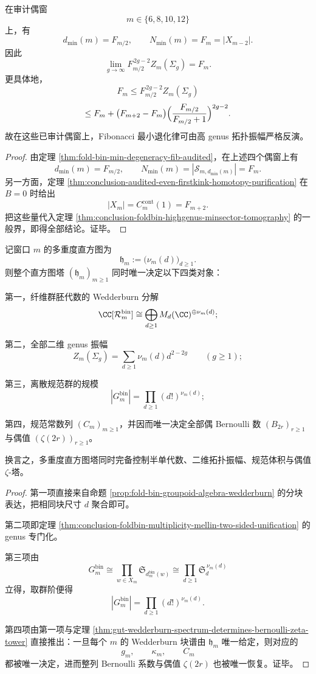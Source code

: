 \begin{corollary}\label{cor:conclusion-foldbin-audited-even-fibonacci-minsector-genus-recovery}
在审计偶窗
\[
m\in\{6,8,10,12\}
\]
上，有
\[
d_{\min}(m)=F_{m/2},
\qquad
N_{\min}(m)=F_m=|X_{m-2}|.
\]
因此
\[
\lim_{g\to\infty}F_{m/2}^{\,2g-2}Z_m(\Sigma_g)=F_m.
\]
更具体地，
\[
F_m
\le
F_{m/2}^{\,2g-2}Z_m(\Sigma_g)
\]
\[
\le
F_m+\bigl(F_{m+2}-F_m\bigr)
\Bigl(\frac{F_{m/2}}{F_{m/2}+1}\Bigr)^{2g-2}.
\]
故在这些已审计偶窗上，Fibonacci 最小退化律可由高 genus 拓扑振幅严格反演。
\end{corollary}
\begin{proof}
由定理 \ref{thm:fold-bin-min-degeneracy-fib-audited}，在上述四个偶窗上有
\[
d_{\min}(m)=F_{m/2},
\qquad
N_{\min}(m)=|\mathcal S_{m,d_{\min}(m)}|=F_m.
\]
另一方面，定理 \ref{thm:conclusion-audited-even-firstkink-homotopy-purification} 在 \(B=0\) 时给出
\[
|X_m|=C_m^{\mathrm{cont}}(1)=F_{m+2}.
\]
把这些量代入定理 \ref{thm:conclusion-foldbin-highgenus-minsector-tomography} 的一般界，即得全部结论。证毕。
\end{proof}

\begin{theorem}\label{thm:conclusion-foldbin-histogram-tower-arithmetic-topological-completeness}
记窗口 \(m\) 的多重度直方图为
\[
\mathfrak h_m:=\bigl(\nu_m(d)\bigr)_{d\ge 1}.
\]
则整个直方图塔 \((\mathfrak h_m)_{m\ge 1}\) 同时唯一决定以下四类对象：

第一，纤维群胚代数的 Wedderburn 分解
\[
\CC[\mathcal R_m^{\mathrm{bin}}]
\cong
\bigoplus_{d\ge 1}M_d(\CC)^{\oplus \nu_m(d)};
\]

第二，全部二维 genus 振幅
\[
Z_m(\Sigma_g)=\sum_{d\ge 1}\nu_m(d)d^{2-2g}
\qquad(g\ge 1);
\]

第三，离散规范群的规模
\[
|G_m^{\mathrm{bin}}|
=
\prod_{d\ge 1}(d!)^{\nu_m(d)};
\]

第四，规范常数列 \((C_m)_{m\ge 1}\)，并因而唯一决定全部偶 Bernoulli 数 \((B_{2r})_{r\ge 1}\) 与偶值 \((\zeta(2r))_{r\ge 1}\)。

换言之，多重度直方图塔同时完备控制半单代数、二维拓扑振幅、规范体积与偶值 \(\zeta\)-塔。
\end{theorem}
\begin{proof}
第一项直接来自命题 \ref{prop:fold-bin-groupoid-algebra-wedderburn} 的分块表达，把相同块尺寸 \(d\) 聚合即可。

第二项即定理 \ref{thm:conclusion-foldbin-multiplicity-mellin-two-sided-unification} 的 genus 专门化。

第三项由
\[
G_m^{\mathrm{bin}}
\cong
\prod_{w\in X_m}\mathfrak S_{d_m^{\mathrm{bin}}(w)}
\cong
\prod_{d\ge 1}\mathfrak S_d^{\,\nu_m(d)}
\]
立得，取群阶便得
\[
|G_m^{\mathrm{bin}}|=\prod_{d\ge 1}(d!)^{\nu_m(d)}.
\]

第四项由第一项与定理 \ref{thm:gut-wedderburn-spectrum-determines-bernoulli-zeta-tower} 直接推出：一旦每个 \(m\) 的 Wedderburn 块谱由 \(\mathfrak h_m\) 唯一给定，则对应的
\[
g_m,\qquad \kappa_m,\qquad C_m
\]
都被唯一决定，进而整列 Bernoulli 系数与偶值 \(\zeta(2r)\) 也被唯一恢复。证毕。
\end{proof}

